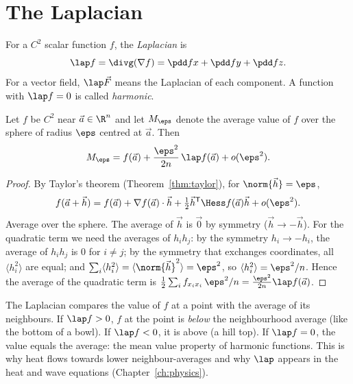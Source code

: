 \section{The Laplacian}

\begin{definition}[Laplacian]
For a $C^2$ scalar function $f$, the \emph{Laplacian} is
\[
\lap f=\divg(\nabla f)=\pdd fx+\pdd fy+\pdd fz .
\]
For a vector field, $\lap\vec F$ means the Laplacian of each component. A function with $\lap f=0$ is called \emph{harmonic}.
\end{definition}

\begin{theorem}\label{thm:laplacemeaning}
Let $f$ be $C^2$ near $\vec a\in\R^n$ and let $M_\eps$ denote the average value of $f$ over the sphere of radius $\eps$ centred at $\vec a$. Then
\[
M_\eps=f(\vec a)+\frac{\eps^2}{2n}\,\lap f(\vec a)+o(\eps^2).
\]
\end{theorem}

\begin{proof}
By Taylor's theorem (Theorem~\ref{thm:taylor}), for $\norm{\vec h}=\eps$,
\[
f(\vec a+\vec h)=f(\vec a)+\nabla f(\vec a)\cdot\vec h+\tfrac12\vec h^{\mathsf T}\Hess f(\vec a)\vec h+o(\eps^2).
\]
Average over the sphere. The average of $\vec h$ is $\vec0$ by symmetry ($\vec h\to-\vec h$). For the quadratic term we need the averages of $h_ih_j$: by the symmetry $h_i\to-h_i$, the average of $h_ih_j$ is $0$ for $i\ne j$; by the symmetry that exchanges coordinates, all $\langle h_i^2\rangle$ are equal; and $\sum_i\langle h_i^2\rangle=\langle\norm{\vec h}^2\rangle=\eps^2$, so $\langle h_i^2\rangle=\eps^2/n$. Hence the average of the quadratic term is $\tfrac12\sum_if_{x_ix_i}\,\eps^2/n=\frac{\eps^2}{2n}\lap f(\vec a)$.
\end{proof}

\begin{intuition}
The Laplacian compares the value of $f$ at a point with the average of its neighbours. If $\lap f>0$, $f$ at the point is \emph{below} the neighbourhood average (like the bottom of a bowl). If $\lap f<0$, it is above (a hill top). If $\lap f=0$, the value equals the average: the mean value property of harmonic functions. This is why heat flows towards lower neighbour-averages and why $\lap$ appears in the heat and wave equations (Chapter~\ref{ch:physics}).
\end{intuition}


